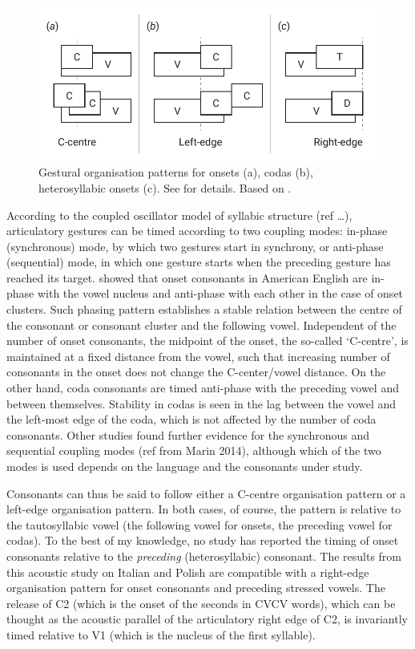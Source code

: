 \documentclass[]{JASAnew}
\begin{document}
\label{s:gestural}

\begin{figure}
  \centering
  \includegraphics{img/gorganisation.pdf}
  \caption{Gestural organisation patterns for onsets (a), codas (b), heterosyllabic onsets (c). See  for details. Based on \citet{marin2010}.}
  \label{f:gorganisation}
\end{figure}

According to the coupled oscillator model of syllabic structure (ref
\ldots{}), articulatory gestures can be timed according to two coupling
modes: in-phase (synchronous) mode, by which two gestures start in
synchrony, or anti-phase (sequential) mode, in which one gesture starts
when the preceding gesture has reached its target. \citet{marin2010}
showed that onset consonants in American English are in-phase with the
vowel nucleus and anti-phase with each other in the case of onset
clusters. Such phasing pattern establishes a stable relation between the
centre of the consonant or consonant cluster and the following vowel.
Independent of the number of onset consonants, the midpoint of the
onset, the so-called `C-centre', is maintained at a fixed distance from
the vowel, such that increasing number of consonants in the onset does
not change the C-center/vowel distance. On the other hand, coda
consonants are timed anti-phase with the preceding vowel and between
themselves. Stability in codas is seen in the lag between the vowel and
the left-most edge of the coda, which is not affected by the number of
coda consonants. Other studies found further evidence for the
synchronous and sequential coupling modes (ref from Marin 2014),
although which of the two modes is used depends on the language and the
consonants under study.

Consonants can thus be said to follow either a C-centre organisation
pattern or a left-edge organisation pattern. In both cases, of course,
the pattern is relative to the tautosyllabic vowel (the following vowel
for onsets, the preceding vowel for codas). To the best of my knowledge,
no study has reported the timing of onset consonants relative to the
\emph{preceding} (heterosyllabic) consonant. The results from this
acoustic study on Italian and Polish are compatible with a right-edge
organisation pattern for onset consonants and preceding stressed vowels.
The release of C2 (which is the onset of the seconds in CVCV words),
which can be thought as the acoustic parallel of the articulatory right
edge of C2, is invariantly timed relative to V1 (which is the nucleus of
the first syllable).
\end{document}
